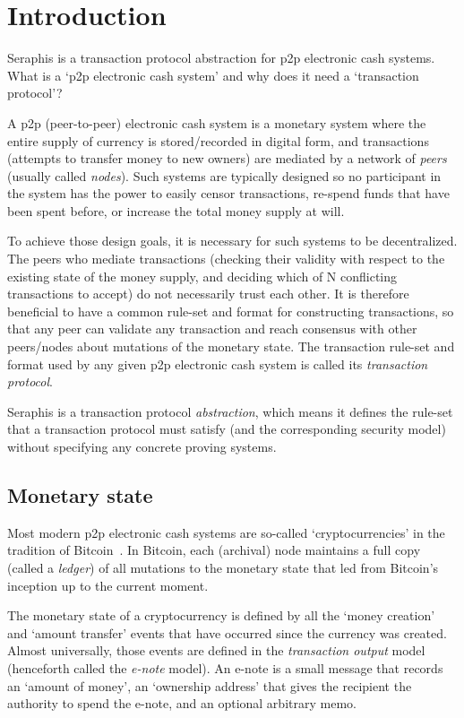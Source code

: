 \section{Introduction}
\label{sec:introduction}

Seraphis is a transaction protocol abstraction for p2p electronic cash systems. What is a `p2p electronic cash system' and why does it need a `transaction protocol'?

A p2p (peer-to-peer) electronic cash system is a monetary system where the entire supply of currency is stored/recorded in digital form, and transactions (attempts to transfer money to new owners) are mediated by a network of {\em peers} (usually called {\em nodes}). Such systems are typically designed so no participant in the system has the power to easily censor transactions, re-spend funds that have been spent before, or increase the total money supply at will.

To achieve those design goals, it is necessary for such systems to be decentralized. The peers who mediate transactions (checking their validity with respect to the existing state of the money supply, and deciding which of N conflicting transactions to accept) do not necessarily trust each other. It is therefore beneficial to have a common rule-set and format for constructing transactions, so that any peer can validate any transaction and reach consensus with other peers/nodes about mutations of the monetary state. The transaction rule-set and format used by any given p2p electronic cash system is called its {\em transaction protocol}.

Seraphis is a transaction protocol {\em abstraction}, which means it defines the rule-set that a transaction protocol must satisfy (and the corresponding security model) without specifying any concrete proving systems.


\subsection{Monetary state}
\label{subsec:intro-monetary-state}

Most modern p2p electronic cash systems are so-called `cryptocurrencies' in the tradition of Bitcoin~\cite{Nakamoto_bitcoin}. In Bitcoin, each (archival) node maintains a full copy (called a {\em ledger}) of all mutations to the monetary state that led from Bitcoin's inception up to the current moment.

The monetary state of a cryptocurrency is defined by all the `money creation' and `amount transfer' events that have occurred since the currency was created. Almost universally, those events are defined in the {\em transaction output} model (henceforth called the {\em e-note} model). An e-note is a small message that records an `amount of money', an `ownership address' that gives the recipient the authority to spend the e-note, and an optional arbitrary memo.

